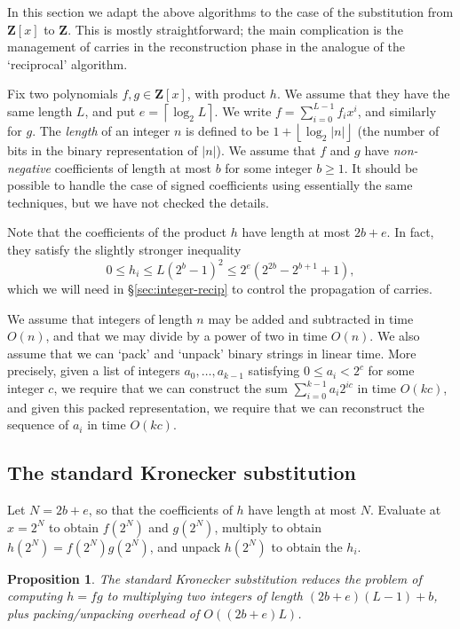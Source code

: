 \documentclass{amsart}
\newcommand{\ZZ}{\mathbf{Z}}
\newcommand{\ceil}[1]{\left\lceil{#1}\right\rceil}
\newcommand{\floor}[1]{\left\lfloor{#1}\right\rfloor}
\newtheorem{prop}[thm]{Proposition}
\theoremstyle{definition}
\theoremstyle{remark}
\begin{document}
In this section we adapt the above algorithms to the case of the substitution from $\ZZ[x]$ to $\ZZ$. This is mostly straightforward; the main complication is the management of carries in the reconstruction phase in the analogue of the `reciprocal' algorithm.

Fix two polynomials $f, g \in \ZZ[x]$, with product $h$. We assume that they have the same length $L$, and put $e = \ceil{\log_2 L}$. We write $f = \sum_{i=0}^{L-1} f_i x^i$, and similarly for $g$. The \emph{length} of an integer $n$ is defined to be $1 + \floor{\log_2|n|}$ (the number of bits in the binary representation of $|n|$). We assume that $f$ and $g$ have \emph{non-negative} coefficients of length at most $b$ for some integer $b \geq 1$. It should be possible to handle the case of signed coefficients using essentially the same techniques, but we have not checked the details.

Note that the coefficients of the product $h$ have length at most $2b + e$. In fact, they satisfy the slightly stronger inequality
\begin{equation}
\label{eq:h-inequality}
 0 \leq h_i \leq L (2^b - 1)^2 \leq 2^e (2^{2b} - 2^{b+1} + 1),
\end{equation}
which we will need in \S\ref{sec:integer-recip} to control the propagation of carries.

We assume that integers of length $n$ may be added and subtracted in time $O(n)$, and that we may divide by a power of two in time $O(n)$. We also assume that we can `pack' and `unpack' binary strings in linear time. More precisely, given a list of integers $a_0, \ldots, a_{k-1}$ satisfying $0 \leq a_i < 2^c$ for some integer $c$, we require that we can construct the sum $\sum_{i=0}^{k-1} a_i 2^{ic}$ in time $O(kc)$, and given this packed representation, we require that we can reconstruct the sequence of $a_i$ in time $O(kc)$.

 

\subsection{The standard Kronecker substitution}
\label{sec:integer-std}

Let $N = 2b + e$, so that the coefficients of $h$ have length at most $N$. Evaluate at $x = 2^N$ to obtain $f(2^N)$ and $g(2^N)$, multiply to obtain $h(2^N) = f(2^N) g(2^N)$, and unpack $h(2^N)$ to obtain the $h_i$.

\begin{prop}
The standard Kronecker substitution reduces the problem of computing $h = fg$ to multiplying two integers of length $(2b+e)(L-1) + b$, plus packing/unpacking overhead of $O((2b+e)L)$.
\end{prop}
\end{document}
